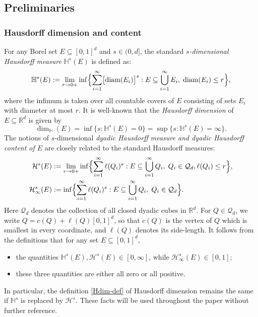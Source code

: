 \documentclass[a4paper,11pt]{amsart}
\numberwithin{equation}{section}
\begin{document}
\subsection{Preliminaries} \label{preliminaries-section}
\subsubsection{Hausdorff dimension and content} For any Borel set $E \subseteq [0,1]^d$ and $s \in (0, d]$, the standard {\em{$s$-dimensional Hausdorff measure}} $\mathbb H^s(E)$\cite[Chapter 2]{Mattila-Book2} is defined as: 
\begin{equation}  
\mathbb H^s(E) := \lim_{r \rightarrow 0+} \inf \Bigl\{\sum_{i=1}^{\infty} \bigl[\text{diam}(E_i) \bigr]^s : E \subseteq \bigcup_{i=1}^{\infty} E_i, \; \text{diam}(E_i) \leq r \Bigr\}, 
\end{equation}
where the infimum is taken over all countable covers of $E$ consisting of sets $E_i$ with diameter at most $r$. It is well-known that the {\em{Hausdorff dimension}} of $E \subseteq \mathbb R^d$ is given by 
\begin{equation} \label{Hdim-def} \dim_{\mathbb H}(E) = \inf \bigl\{s : \mathbb H^s(E) = 0 \bigr\} = \sup \bigl\{s : \mathbb H^s(E) = \infty \bigr\}. \end{equation} 
The notions of $s$-dimensional {\em{dyadic Hausdorff measure and dyadic Hausdorff content of $E$}} are closely related to the standard Hausdorff measures: 
\begin{align}  
\mathcal H^s(E) &:=  \lim_{r \rightarrow 0+} \inf \Bigl\{\sum_{i=1}^{\infty} \ell(Q_i)^s : E \subseteq \bigcup_{i=1}^{\infty} Q_i, \; Q_i \in \mathcal Q_d, \ell(Q_i) \leq r \Bigr\}, \noindent \\ 
 \mathcal H_{\infty}^{s}(E) &:= \inf \Bigl\{ \sum_{i=1}^{\infty} \ell(Q_i)^s : E \subseteq \bigcup_{i=1}^{\infty} Q_i, \; Q_i \in \mathcal Q_d \Bigr\}. \label{dyadic-H-content-def}
 \end{align} 
Here $\mathcal Q_d$ denotes the collection of all closed dyadic cubes in $\mathbb R^d$. For $Q \in \mathcal Q_d$, we write $Q = c(Q) + \ell(Q)[0,1]^d$, so that $c(Q)$ is the vertex of $Q$ which is smallest in every coordinate, and $\ell(Q)$ denotes its side-length. It follows from the definitions that for any set $E \subseteq [0,1]^d$,
\vskip0.1in
\begin{itemize}  
\item the quantities $\mathbb H^s(E), \mathcal H^s(E) \in [0, \infty]$, while $\mathcal H^s_{\infty}(E) \in [0,1]$;   
\vskip0.1in
\item these three quantities are either all zero or all positive.
\end{itemize}  
\vskip0.1in 
In particular, the definition \eqref{Hdim-def} of Hausdorff dimension remains the same if $\mathbb H^s$ is replaced by $\mathcal H^s$.  These facts will be used throughout the paper without further reference. 
\vskip0.1in
\end{document}
